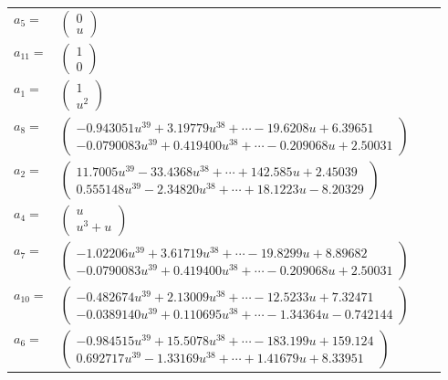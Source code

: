 \documentclass[1p]{elsarticle_modified}
\theoremstyle{definition}
\begin{document}
\begin{tabular}{m{7pt} m{180pt} m{7pt} m{180pt} }
\flushright $a_{5}=$&$\begin{pmatrix}0\\u\end{pmatrix}$ \\
\flushright $a_{11}=$&$\begin{pmatrix}1\\0\end{pmatrix}$ \\
\flushright $a_{1}=$&$\begin{pmatrix}1\\u^2\end{pmatrix}$ \\
\flushright $a_{8}=$&$\begin{pmatrix}-0.943051 u^{39}+3.19779 u^{38}+\cdots-19.6208 u+6.39651\\-0.0790083 u^{39}+0.419400 u^{38}+\cdots-0.209068 u+2.50031\end{pmatrix}$ \\
\flushright $a_{2}=$&$\begin{pmatrix}11.7005 u^{39}-33.4368 u^{38}+\cdots+142.585 u+2.45039\\0.555148 u^{39}-2.34820 u^{38}+\cdots+18.1223 u-8.20329\end{pmatrix}$ \\
\flushright $a_{4}=$&$\begin{pmatrix}u\\u^3+u\end{pmatrix}$ \\
\flushright $a_{7}=$&$\begin{pmatrix}-1.02206 u^{39}+3.61719 u^{38}+\cdots-19.8299 u+8.89682\\-0.0790083 u^{39}+0.419400 u^{38}+\cdots-0.209068 u+2.50031\end{pmatrix}$ \\
\flushright $a_{10}=$&$\begin{pmatrix}-0.482674 u^{39}+2.13009 u^{38}+\cdots-12.5233 u+7.32471\\-0.0389140 u^{39}+0.110695 u^{38}+\cdots-1.34364 u-0.742144\end{pmatrix}$ \\
\flushright $a_{6}=$&$\begin{pmatrix}-0.984515 u^{39}+15.5078 u^{38}+\cdots-183.199 u+159.124\\0.692717 u^{39}-1.33169 u^{38}+\cdots+1.41679 u+8.33951\end{pmatrix}$ \\

\end{tabular}
\end{document}
